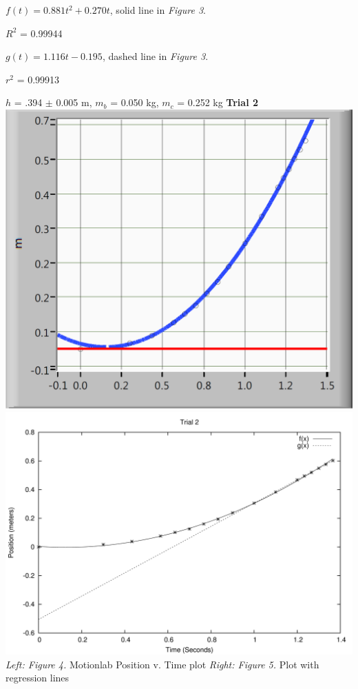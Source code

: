 \documentclass[12pt,letterpaper]{article}
\begin{document}
\(f(t) = 0.881t^2 + 0.270t\), solid line in \textit{Figure 3}.

\(R^2\) = 0.99944

\(g(t) = 1.116t - 0.195\), dashed line in \textit{Figure 3}.

\(r^2\) = 0.99913

\(h\) = .394 \(\pm\) 0.005 m, \(m_b\) = 0.050 kg, \(m_c\) = 0.252 kg
\newline\newline
\textbf{Trial 2}
\newline\newline
\includegraphics[scale=0.43]{t2p.PNG}
\includegraphics[scale=0.7]{2.png}
\newline
\textit{Left: Figure 4.} Motionlab Position v. Time plot \textit{Right: Figure 5.} Plot with regression lines
\newline
\end{document}
